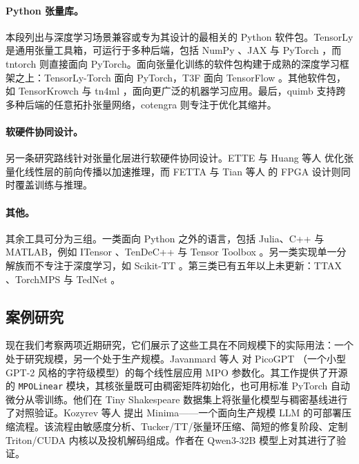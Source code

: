 \paragraph{Python 张量库。}本段列出与深度学习场景兼容或专为其设计的最相关的 Python 软件包。TensorLy \cite{kossaifi2019tensorly} 是通用张量工具箱，可运行于多种后端，包括 NumPy \cite{harris2020numpy}、JAX \cite{bradbury2018jax} 与 PyTorch \cite{paszke2019pytorch}，而 tntorch \cite{usvyatsov2022tntorch} 则直接面向 PyTorch。面向张量化训练的软件包构建于成熟的深度学习框架之上：TensorLy-Torch \cite{kossaifi2024tensorlytorch} 面向 PyTorch，T3F \cite{novikov2020t3f} 面向 TensorFlow \cite{abadi2016tensorflow}。其他软件包，如 TensorKrowch \cite{pareja2024tensorkrowch} 与 tn4ml \cite{puljak2025tn4ml}，面向更广泛的机器学习应用。最后，quimb \cite{gray2018quimb} 支持跨多种后端的任意拓扑张量网络，cotengra \cite{gray2021hyperoptimized} 则专注于优化其缩并。

\paragraph{软硬件协同设计。}另一条研究路线针对张量化层进行软硬件协同设计。ETTE \cite{gong2023ette} 与 Huang 等人 \cite{huang2025gvsa} 优化张量化线性层的前向传播以加速推理，而 FETTA \cite{lu2026fetta} 与 Tian 等人 \cite{tian2025fpga} 的 FPGA 设计则同时覆盖训练与推理。

\paragraph{其他。}其余工具可分为三组。一类面向 Python 之外的语言，包括 Julia、C++ 与 MATLAB，例如 ITensor \cite{fishman2022itensor}、TenDeC++ \cite{huang2019tendec} 与 Tensor Toolbox \cite{bader2026tensortoolbox}。另一类实现单一分解族而不专注于深度学习，如 Scikit-TT \cite{gelss2019scikittt}。第三类已有五年以上未更新：TTAX \cite{novikov2021ttax}、TorchMPS \cite{miller2019torchmps} 与 TedNet \cite{yu2022tednet}。

\subsection{案例研究}

现在我们考察两项近期研究，它们展示了这些工具在不同规模下的实际用法：一个处于研究规模，另一个处于生产规模。Javanmard 等人 \cite{javanmard2026mpopicogpt} 对 PicoGPT \cite{osborne2026picogptjl}（一个小型 GPT-2 风格的字符级模型）的每个线性层应用 MPO 参数化。其工作提供了开源的 \texttt{MPOLinear} 模块，其核张量既可由稠密矩阵初始化，也可用标准 PyTorch 自动微分从零训练。他们在 Tiny Shakespeare 数据集上将张量化模型与稠密基线进行了对照验证。Kozyrev 等人 \cite{kozyrev2026minima} 提出 Minima——一个面向生产规模 LLM 的可部署压缩流程。该流程由敏感度分析、Tucker/TT/张量环压缩、简短的修复阶段、定制 Triton/CUDA 内核以及投机解码组成。作者在 Qwen3-32B \cite{yang2025qwen3} 模型上对其进行了验证。


